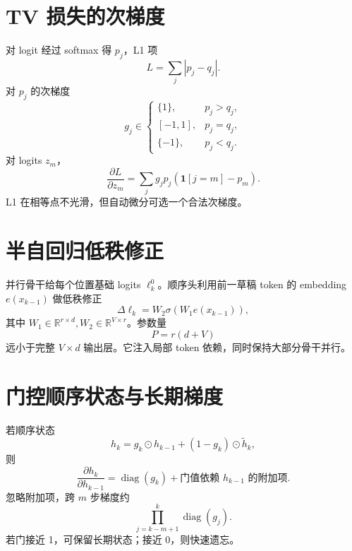 \documentclass[UTF8,12pt,a4paper,fontset=none]{ctexart}
\numberwithin{equation}{section}
\newcommand{\R}{\mathbb{R}}
\begin{document}
\section{TV 损失的次梯度}
对 logit 经过 softmax 得 $p_j$，L1 项
\begin{equation}
 L=\sum_j|p_j-q_j|.
\end{equation}
对 $p_j$ 的次梯度
\begin{equation}
 g_j\in\begin{cases}
 \{1\},&p_j>q_j,\\
 [-1,1],&p_j=q_j,\\
 \{-1\},&p_j<q_j.
 \end{cases}
\end{equation}
对 logits $z_m$，
\begin{equation}
 \frac{\partial L}{\partial z_m}
 =\sum_jg_jp_j(\mathbf 1[j=m]-p_m).
\end{equation}
L1 在相等点不光滑，但自动微分可选一个合法次梯度。

\section{半自回归低秩修正}
并行骨干给每个位置基础 logits $\ell_k^0$。顺序头利用前一草稿 token 的 embedding $e(x_{k-1})$ 做低秩修正
\begin{equation}
 \Delta\ell_k=W_2\sigma(W_1e(x_{k-1})),
\end{equation}
其中 $W_1\in\R^{r\times d},W_2\in\R^{V\times r}$。参数量
\begin{equation}
 P=r(d+V)
\end{equation}
远小于完整 $V\times d$ 输出层。它注入局部 token 依赖，同时保持大部分骨干并行。

\section{门控顺序状态与长期梯度}
若顺序状态
\begin{equation}
 h_k=g_k\odot h_{k-1}+(1-g_k)\odot\widetilde h_k,
\end{equation}
则
\begin{equation}
 \frac{\partial h_k}{\partial h_{k-1}}
 =\operatorname{diag}(g_k)+
 \text{门值依赖 $h_{k-1}$ 的附加项}.
\end{equation}
忽略附加项，跨 $m$ 步梯度约
\begin{equation}
 \prod_{j=k-m+1}^{k}\operatorname{diag}(g_j).
\end{equation}
若门接近 1，可保留长期状态；接近 0，则快速遗忘。
\end{document}

